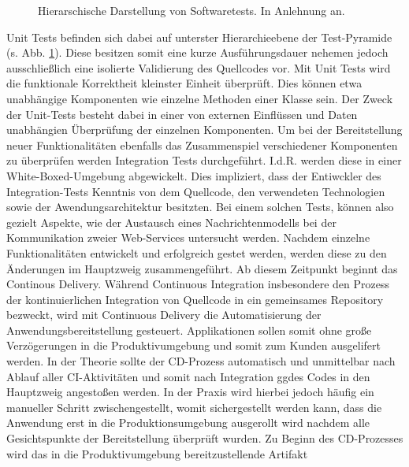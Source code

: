 \begin{center}
	\begin{figure}[H]
		\centering
		\caption[Hierarschische Darstellung von Softwaretests]{Hierarschische Darstellung von Softwaretests. In Anlehnung an.}
		\label{fig:Tests}
	\end{figure}
\end{center}
\vspace*{-10mm}
Unit Tests befinden sich dabei auf unterster Hierarchieebene der Test-Pyramide (s. Abb. \ref*{fig:Tests}). Diese besitzen somit eine kurze Ausführungsdauer nehemen jedoch ausschließlich eine isolierte Validierung des Quellcodes vor. Mit Unit Tests wird die funktionale Korrektheit kleinster Einheit überprüft. Dies können etwa unabhängige Komponenten wie einzelne Methoden einer Klasse sein. Der Zweck der Unit-Tests besteht dabei in einer von externen Einflüssen und Daten unabhängien Überprüfung der einzelnen Komponenten. Um bei der Bereitstellung neuer Funktionalitäten ebenfalls das Zusammenspiel verschiedener Komponenten zu überprüfen werden Integration Tests durchgeführt. I.d.R. werden diese in einer White-Boxed-Umgebung abgewickelt. Dies impliziert, dass der Entiwckler des Integration-Tests Kenntnis von dem Quellcode, den verwendeten Technologien sowie der Awendungsarchitektur besitzten. Bei einem solchen Tests, können also gezielt Aspekte, wie der Austausch eines Nachrichtenmodells bei der Kommunikation zweier Web-Services untersucht werden. Nachdem einzelne Funktionalitäten entwickelt und erfolgreich gestet werden, werden diese zu den Änderungen im Hauptzweig zusammengeführt. Ab diesem Zeitpunkt beginnt das Continous Delivery.  Während Continuous Integration insbesondere den Prozess der kontinuierlichen Integration von Quellcode in ein gemeinsames Repository bezweckt, wird mit Continuous Delivery die Automatisierung der Anwendungsbereitstellung gesteuert. Applikationen sollen somit ohne große Verzögerungen in die Produktivumgebung und somit zum Kunden ausgelifert werden. In der Theorie sollte der CD-Prozess automatisch und unmittelbar nach Ablauf aller CI-Aktivitäten und somit nach Integration ggdes Codes in den Hauptzweig angestoßen werden. In der Praxis wird hierbei jedoch häufig ein manueller Schritt zwischengestellt, womit sichergestellt werden kann, dass die Anwendung erst in die Produktionsumgebung ausgerollt wird nachdem alle Gesichtspunkte der Bereitstellung überprüft wurden. Zu Beginn des CD-Prozesses wird das in die Produktivumgebung bereitzustellende Artifakt 
